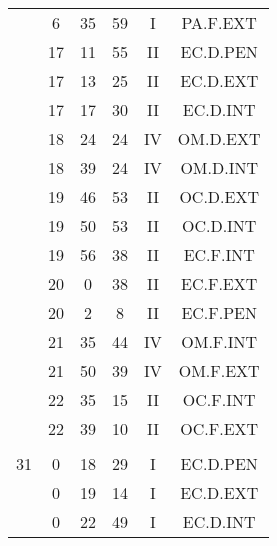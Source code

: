 \documentclass[12pt, a4paper]{article}
\begin{document}
\begin{multicols}{3}
{\begin{tabular}{c c c c c c}
	 	 	 	 & 6 & 35 & 59 & I & PA.F.EXT\\%
	 	 	 	 & 17 & 11 & 55 & II & EC.D.PEN\\%
	 	 	 	 & 17 & 13 & 25 & II & EC.D.EXT\\%
	 	 	 	 & 17 & 17 & 30 & II & EC.D.INT\\%
	 	 	 	 & 18 & 24 & 24 & IV & OM.D.EXT\\%
	 	 	 	 & 18 & 39 & 24 & IV & OM.D.INT\\%
	 	 	 	 & 19 & 46 & 53 & II & OC.D.EXT\\%
	 	 	 	 & 19 & 50 & 53 & II & OC.D.INT\\%
	 	 	 	 & 19 & 56 & 38 & II & EC.F.INT\\%
	 	 	 	 & 20 & 0 & 38 & II & EC.F.EXT\\%
	 	 	 	 & 20 & 2 & 8 & II & EC.F.PEN\\%
	 	 	 	 & 21 & 35 & 44 & IV & OM.F.INT\\%
	 	 	 	 & 21 & 50 & 39 & IV & OM.F.EXT\\%
	 	 	 	 & 22 & 35 & 15 & II & OC.F.INT\\%
	 	 	 	 & 22 & 39 & 10 & II & OC.F.EXT\\%
	 	 	 	 & & & & & \\%
	 	 	 	31 & 0 & 18 & 29 & I & EC.D.PEN\\%
	 	 	 	 & 0 & 19 & 14 & I & EC.D.EXT\\%
	 	 	 	 & 0 & 22 & 49 & I & EC.D.INT\\%
	 	 \end{tabular}
 	}
\end{multicols}
\end{document}
